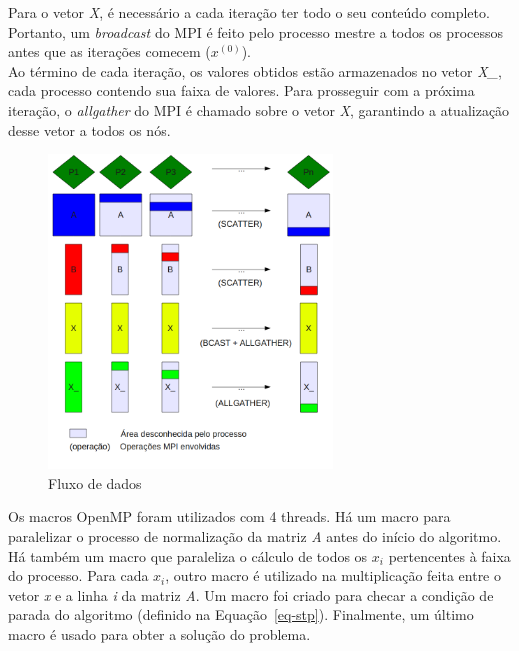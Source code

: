 \documentclass[a4paper]{article}
\begin{document}
\indent Para o vetor \emph{X}, é necessário a cada iteração ter todo o seu conteúdo completo. Portanto, um \emph{broadcast} do MPI é feito pelo processo mestre a todos os processos antes que as iterações comecem (\begin{math}x^{(0)}\end{math}).\\
\indent Ao término de cada iteração, os valores obtidos estão armazenados no vetor \emph{X\_}, cada processo contendo sua faixa de valores. Para prosseguir com a próxima iteração, o \emph{allgather} do MPI é chamado sobre o vetor \emph{X}, garantindo a atualização desse vetor a todos os nós.\\
\begin{figure}[float=h!]
	\centerline{\includegraphics[width=285px, height=315px]{data}}
	\caption{Fluxo de dados}
	\label{pic-data}
\end{figure}
\indent Os macros OpenMP foram utilizados com 4 threads. Há um macro para paralelizar o processo de normalização da matriz \emph{A} antes do início do algoritmo. Há também um macro que paraleliza o cálculo de todos os \begin{math}x_i\end{math} pertencentes à faixa do processo. Para cada \begin{math}x_i\end{math}, outro macro é utilizado na multiplicação feita entre o vetor \emph{x} e a linha \emph{i} da matriz \emph{A}. Um macro foi criado para checar a condição de parada do algoritmo (definido na Equação~\ref{eq-stp}). Finalmente, um último macro é usado para obter a solução do problema.

\newpage
\end{document}
